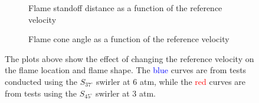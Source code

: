 \begin{figure}

\begin{subfigure}{\linewidth}
  \centering
  
  \caption{Flame standoff distance as a function of the reference velocity}
  \label{fig:referenceVelocityDistance}
\end{subfigure}

\begin{subfigure}{\linewidth}
  \centering
  
  \caption{Flame cone angle as a function of the reference velocity}
  \label{fig:referenceVelocityAngle}
\end{subfigure}

\caption[Effect of reference velocity on the flame location and shape]{The plots above show the effect of changing the reference velocity on the flame location and flame shape. The \textcolor{blue}{blue} curves are from tests conducted using the \(S_{37^\circ}\) swirler at 6 atm, while the \textcolor{red}{red} curves are from tests using the \(S_{45^\circ}\) swirler at 3 atm.}

\label{fig:referenceVelocityResults}

\end{figure}

